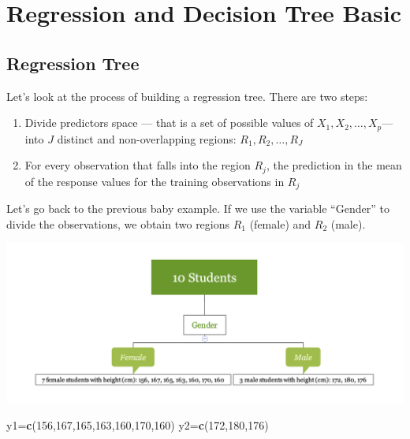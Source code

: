 \documentclass[12pt,]{krantz}
\makeatletter
\newenvironment{Shaded}{\begin{snugshade}}{\end{snugshade}}
\newcommand{\DecValTok}[1]{\textcolor[rgb]{0.06,0.06,0.06}{#1}}
\newcommand{\KeywordTok}[1]{\textcolor[rgb]{0.27,0.27,0.27}{\textbf{#1}}}
\newcommand{\NormalTok}[1]{#1}
\providecommand{\tightlist}{%
  \setlength{\itemsep}{0pt}\setlength{\parskip}{0pt}}
\newenvironment{kframe}{%
\medskip{}
\setlength{\fboxsep}{.8em}
 \def\at@end@of@kframe{}%
 \ifinner\ifhmode%
  \def\at@end@of@kframe{\end{minipage}}%
  \begin{minipage}{\columnwidth}%
 \fi\fi%
 \def\FrameCommand##1{\hskip\@totalleftmargin \hskip-\fboxsep
 \colorbox{shadecolor}{##1}\hskip-\fboxsep
     \hskip-\linewidth \hskip-\@totalleftmargin \hskip\columnwidth}%
 \MakeFramed {\advance\hsize-\width
   \@totalleftmargin\z@ \linewidth\hsize
   \@setminipage}}%
 {\par\unskip\endMakeFramed%
 \at@end@of@kframe}
\renewenvironment{Shaded}{\begin{kframe}}{\end{kframe}}
\makeatother
\begin{document}
\hypertarget{regression-and-decision-tree-basic}{%
\section{Regression and Decision Tree Basic}\label{regression-and-decision-tree-basic}}

\hypertarget{regression-tree}{%
\subsection{Regression Tree}\label{regression-tree}}

Let's look at the process of building a regression tree\citep{ISLR15}. There are two steps:

\begin{enumerate}
\def\labelenumi{\arabic{enumi}.}
\tightlist
\item
  Divide predictors space --- that is a set of possible values of \(X_1,X_2,\dots,X_p\)--- into \(J\) distinct and non-overlapping regions: \(R_1,R_2,\dots,R_J\)
\item
  For every observation that falls into the region \(R_j\), the prediction in the mean of the response values for the training observations in \(R_j\)
\end{enumerate}

Let's go back to the previous baby example. If we use the variable ``Gender'' to divide the observations, we obtain two regions \(R_1\) (female) and \(R_2\) (male).

\includegraphics{images/varEN.png}

\begin{Shaded}
\begin{Highlighting}[]
\NormalTok{y1=}\KeywordTok{c}\NormalTok{(}\DecValTok{156}\NormalTok{,}\DecValTok{167}\NormalTok{,}\DecValTok{165}\NormalTok{,}\DecValTok{163}\NormalTok{,}\DecValTok{160}\NormalTok{,}\DecValTok{170}\NormalTok{,}\DecValTok{160}\NormalTok{)}
\NormalTok{y2=}\KeywordTok{c}\NormalTok{(}\DecValTok{172}\NormalTok{,}\DecValTok{180}\NormalTok{,}\DecValTok{176}\NormalTok{)}
\end{Highlighting}
\end{Shaded}
\end{document}
